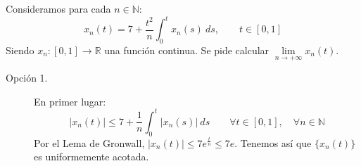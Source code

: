 \documentclass[12pt]{article}
\begin{document}
    \newpage
    \begin{ejercicio}
        Consideramos para cada $n\in \mathbb{N}$:
        \begin{equation*}
            x_n(t) = 7 + \frac{t^2}{n}\int_{0}^{t} x_n(s)~ds , \qquad t\in [0,1]
        \end{equation*}
        Siendo $x_n:[0,1]\to \mathbb{R}$ una función continua. Se pide calcular $\lim\limits_{n\to+\infty}x_n(t)$.\\

        \begin{description}
            \item [Opción 1.] En primer lugar:
                \begin{equation*}
                    |x_n(t)| \leq 7 + \frac{1}{n}\int_{0}^{t} |x_n(s)|~ds  \qquad \forall t\in [0,1],\quad \forall n\in \mathbb{N}
                \end{equation*}
                Por el Lema de Gronwall, $|x_n(t)|\leq 7e^{\frac{t}{n}}\leq 7e$. Tenemos así que $\{x_n(t)\}$ es uniformemente acotada.\\


\end{description}
\end{ejercicio}
\end{document}
